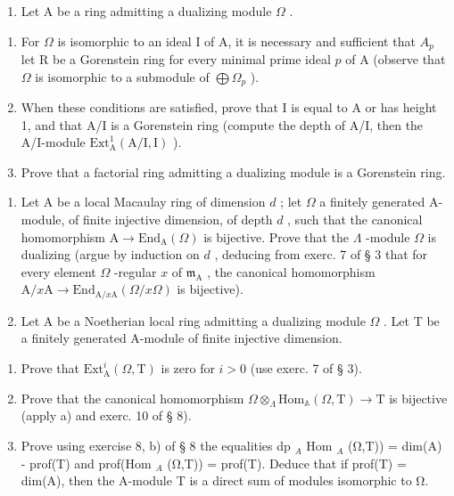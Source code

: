 \begin{enumerate}
\def\labelenumi{\arabic{enumi})}
\setcounter{enumi}{2}
\tightlist
\item
  Let A be a ring admitting a dualizing module \(\Omega\) .
\end{enumerate}

\begin{enumerate}
\def\labelenumi{\alph{enumi})}
\item
  For \(\Omega\) is isomorphic to an ideal I of A, it is necessary and sufficient that \(A_{p}\) let R be a Gorenstein ring for every minimal prime ideal \(p\) of A (observe that \(\Omega\) is isomorphic to a submodule of \(\bigoplus \Omega_{p}\) ).
\item
  When these conditions are satisfied, prove that I is equal to A or has height 1, and that A/I is a Gorenstein ring (compute the depth of A/I, then the A/I-module \(\mathrm{Ext}_{\mathrm{A}}^{1}(\mathrm{A / I,I})\) ).
\item
  Prove that a factorial ring admitting a dualizing module is a Gorenstein ring.
\end{enumerate}

\begin{enumerate}
\def\labelenumi{\arabic{enumi})}
\setcounter{enumi}{3}
\item
  Let A be a local Macaulay ring of dimension \(d\) ; let \(\Omega\) a finitely generated A-module, of finite injective dimension, of depth \(d\) , such that the canonical homomorphism \(\mathrm{A} \to \mathrm{End}_{\mathrm{A}}(\Omega)\) is bijective. Prove that the \(\Lambda\) -module \(\Omega\) is dualizing (argue by induction on \(d\) , deducing from exerc. 7 of § 3 that for every element \(\Omega\) -regular \(x\) of \(\mathfrak{m}_{\mathrm{A}}\) , the canonical homomorphism \(\mathrm{A}/x\mathrm{A} \to \mathrm{End}_{\mathrm{A}/x\mathrm{A}}(\Omega/x\Omega)\) is bijective).
\item
  Let A be a Noetherian local ring admitting a dualizing module \(\Omega\) . Let T be a finitely generated A-module of finite injective dimension.
\end{enumerate}

\begin{enumerate}
\def\labelenumi{\alph{enumi})}
\item
  Prove that \(\mathrm{Ext}_{\mathrm{A}}^{i}(\Omega, \mathrm{T})\) is zero for \(i > 0\) (use exerc. 7 of § 3).
\item
  Prove that the canonical homomorphism \(\Omega\otimes_{\Lambda}\mathrm{Hom}_{\mathbb{A}}(\Omega,\mathrm{T})\to\mathrm{T}\) is bijective (apply a) and exerc. 10 of § 8).
\item
  Prove using exercise 8, b) of § 8 the equalities dp \(_{A}\) Hom \(_{A}\) (Ω,T)) = dim(A) - prof(T) and prof(Hom \(_{A}\) (Ω,T)) = prof(T). Deduce that if prof(T) = dim(A), then the A-module T is a direct sum of modules isomorphic to Ω.
\end{enumerate}

